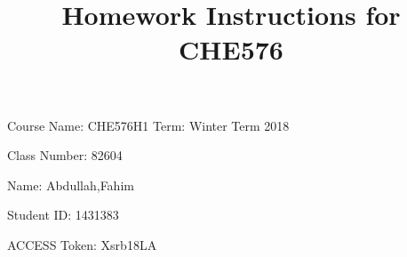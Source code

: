 \documentclass[11pt]{article}
\date{}
\title{Homework Instructions for CHE576}
\begin{document}
\maketitle
{}



\begin{mdframed}
Course Name: CHE576H1    Term: Winter Term 2018

Class Number: 82604

Name: Abdullah,Fahim

Student ID: 1431383

ACCESS Token: Xsrb18LA
\end{mdframed}
\end{document}
